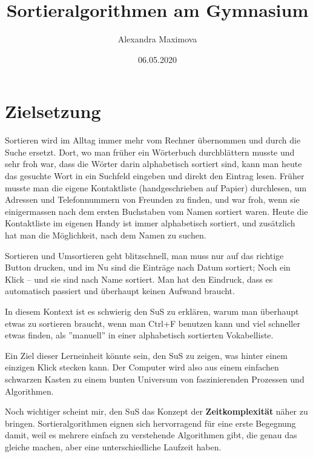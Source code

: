 \documentclass[
	12pt, %
	german, %
]{fphw}
\title{Sortieralgorithmen am Gymnasium} %
\author{Alexandra Maximova} %
\date{06.05.2020} %
\institute{ETH Zurich \\ Lehrdiplom Informatik} %
\begin{document}
\maketitle %


\section*{Zielsetzung}
Sortieren wird im Alltag immer mehr vom Rechner übernommen und durch die Suche ersetzt. Dort, wo man früher ein Wörterbuch durchblättern musste und sehr froh war, dass die Wörter darin alphabetisch sortiert sind, kann man heute das gesuchte Wort in ein Suchfeld eingeben und direkt den Eintrag lesen. Früher musste man die eigene Kontaktliste (handgeschrieben auf Papier) durchlesen, um Adressen und Telefonnummern von Freunden zu finden, und war froh, wenn sie einigermassen nach dem ersten Buchstaben vom Namen sortiert waren. Heute die Kontaktliste im eigenen Handy ist immer alphabetisch sortiert, und zusätzlich hat man die Möglichkeit, nach dem Namen zu suchen.

Sortieren und Umsortieren geht blitzschnell, man muss nur auf das richtige Button drucken, und im Nu sind die Einträge nach Datum sortiert; Noch ein Klick -- und sie sind nach Name sortiert. Man hat den Eindruck, dass es automatisch passiert und überhaupt keinen Aufwand braucht.

In diesem Kontext ist es schwierig den SuS zu erklären, warum man überhaupt etwas zu sortieren braucht, wenn man Ctrl+F benutzen kann und viel schneller etwas finden, als ''manuell'' in einer alphabetisch sortierten Vokabelliste.

Ein Ziel dieser Lerneinheit könnte sein, den SuS zu zeigen, was hinter einem einzigen Klick stecken kann. Der Computer wird also aus einem einfachen schwarzen Kasten zu einem bunten Universum von faszinierenden Prozessen und Algorithmen.

Noch wichtiger scheint mir, den SuS das Konzept der \textbf{Zeitkomplexität} näher zu bringen. Sortieralgorithmen eignen sich hervorragend für eine erste Begegnung damit, weil es mehrere einfach zu verstehende Algorithmen gibt, die genau das gleiche machen, aber eine unterschiedliche Laufzeit haben.
\end{document}
